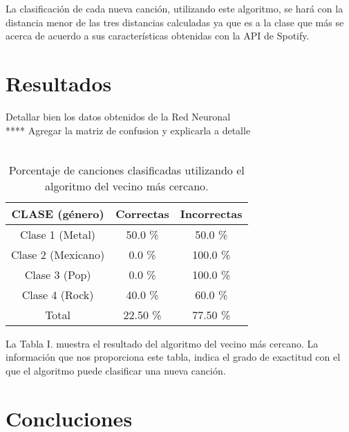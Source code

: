 \documentclass[conference]{IEEEtran}
\begin{document}
La clasificación de cada nueva canción, utilizando este algoritmo, se hará con la distancia menor de las tres distancias calculadas ya que es a la clase que más se acerca de acuerdo a sus características obtenidas con la API de Spotify.

\section{Resultados}

Detallar bien los datos obtenidos de la Red Neuronal \\

**** Agregar la matriz de confusion y explicarla a detalle \\\\

\begin{table}[h]
\renewcommand{\arraystretch}{1.3}
\renewcommand{\tablename}{Tabla}
\caption{ Porcentaje de canciones clasificadas utilizando el algoritmo del vecino más cercano. }
\label{table_example}
\centering
\begin{tabular}{|c|c|c|}
\hline
CLASE (género) & Correctas & Incorrectas \\
\hline
Clase 1 (Metal) & 50.0 \% & 50.0 \% \\
\hline
Clase 2 (Mexicano) & 0.0 \% & 100.0 \% \\
\hline
Clase 3 (Pop) & 0.0 \% & 100.0 \% \\
\hline
Clase 4 (Rock) & 40.0 \% & 60.0 \% \\
\hline
Total & 22.50 \% & 77.50 \% \\
\hline
\end{tabular}
\end{table}

La Tabla I. muestra el resultado del algoritmo del vecino más cercano. La información que nos proporciona este tabla, indica el grado de exactitud con el que el algoritmo puede clasificar una nueva canción. \\

\section{Concluciones}

\begin{thebibliography}{1}
\item [1]
\end{thebibliography}
\end{document}
